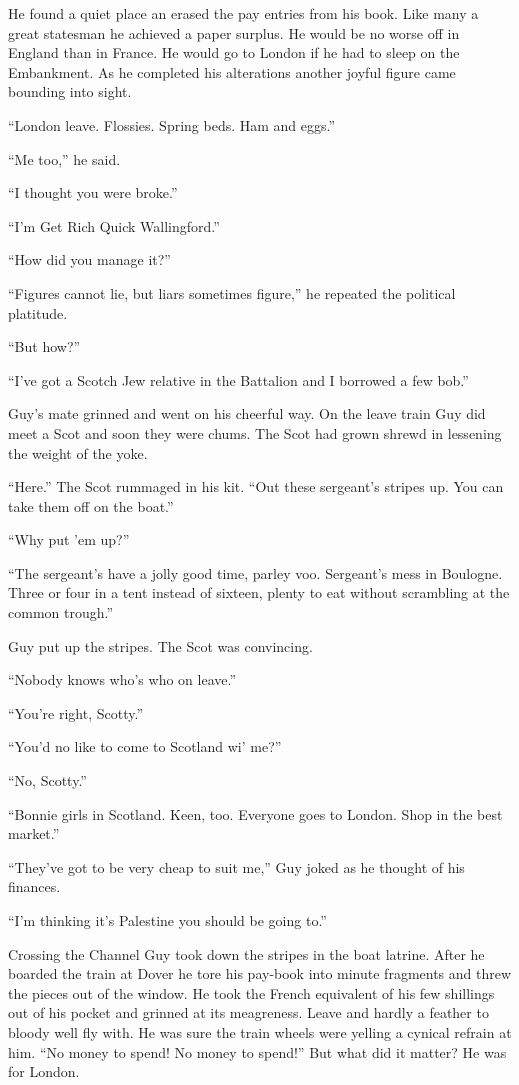 He found a quiet place an erased the pay entries from his book. Like many a great statesman he achieved a paper surplus. He would be no worse off in England than in France. He would go to London if he had to sleep on the Embankment. As he completed his alterations another joyful figure came bounding into sight.

``London leave. Flossies. Spring beds. Ham and eggs.''

``Me too,'' he said.

``I thought you were broke.''

``I'm Get Rich Quick Wallingford.''

``How did you manage it?''

``Figures cannot lie, but liars sometimes figure,'' he repeated the political platitude.

``But how?''

``I've got a Scotch Jew relative in the Battalion and I borrowed a few bob.''

Guy's mate grinned and went on his cheerful way. On the leave train Guy did meet a Scot and soon they were chums. The Scot had grown shrewd in lessening the weight of the yoke.

``Here.'' The Scot rummaged in his kit. ``Out these sergeant's stripes up. You can take them off on the boat.''

``Why put 'em up?''

``The sergeant's have a jolly good time, parley voo. Sergeant's mess in Boulogne. Three or four in a tent instead of sixteen, plenty to eat without scrambling at the common trough.''

Guy put up the stripes. The Scot was convincing.

``Nobody knows who's who on leave.''

``You're right, Scotty.''

``You'd no like to come to Scotland wi' me?''

``No, Scotty.''

``Bonnie girls in Scotland. Keen, too. Everyone goes to London. Shop in the best market.''

``They've got to be very cheap to suit me,'' Guy joked as he thought of his finances.

``I'm thinking it's Palestine you should be going to.''

Crossing the Channel Guy took down the stripes in the boat latrine. After he boarded the train at Dover he tore his pay-book into minute fragments and threw the pieces out of the window. He took the French equivalent of his few shillings out of his pocket and grinned at its meagreness. Leave and hardly a feather to bloody well fly with. He was sure the train wheels were yelling a cynical refrain at him. ``No money to spend! No money to spend!'' But what did it matter? He was for London.

